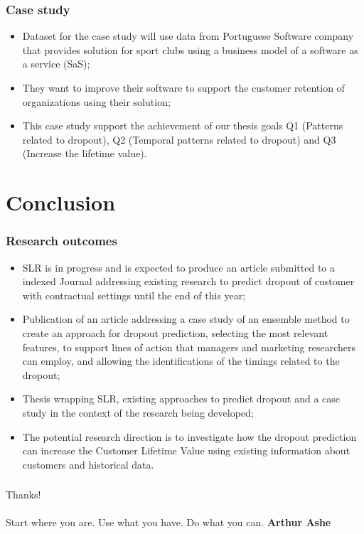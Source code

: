 \documentclass[10pt]{beamer}
\begin{document}
\begin{frame}
	\frametitle{Case study}
	\begin{itemize}
		\item Dataset for the case study will use data from Portuguese Software company that provides solution for sport 
			  clubs using a business model of a software as a service (SaS);
		\item They want to improve their software to support the customer retention of organizations using their solution;
		\item This case study support the achievement of our thesis goals Q1 (Patterns related to dropout), 
			  Q2 (Temporal patterns related to dropout) and Q3 (Increase the lifetime value).
	\end{itemize}
\end{frame}
\section{Conclusion}
\begin{frame}
	\frametitle{Research outcomes}
	\begin{itemize}

		\item SLR is in progress and is expected to produce an article submitted to a indexed Journal addressing existing research to predict
		dropout of customer with contractual settings until the end of this year;
		\item Publication of an article addressing a case study of an ensemble method to create an approach for dropout prediction, selecting the 
		most relevant features, to support lines of action that managers and marketing researchers can employ, and allowing the identifications 
		of the timings related to the dropout;
		\item Thesis wrapping SLR, existing approaches to predict dropout and a case study in the context of the research being developed;
		\item The potential research direction is to investigate how the dropout prediction can increase the Customer Lifetime Value using existing
		information about customers and historical data.
	\end{itemize}
	\tiny 

\end{frame}


\begin{frame}
\frametitle{}
\normalsize
	\Huge Thanks! \\~\\
	\Large Start where you are. Use what you have. Do what you can. \textbf{Arthur Ashe}
\end{frame}
\end{document}

